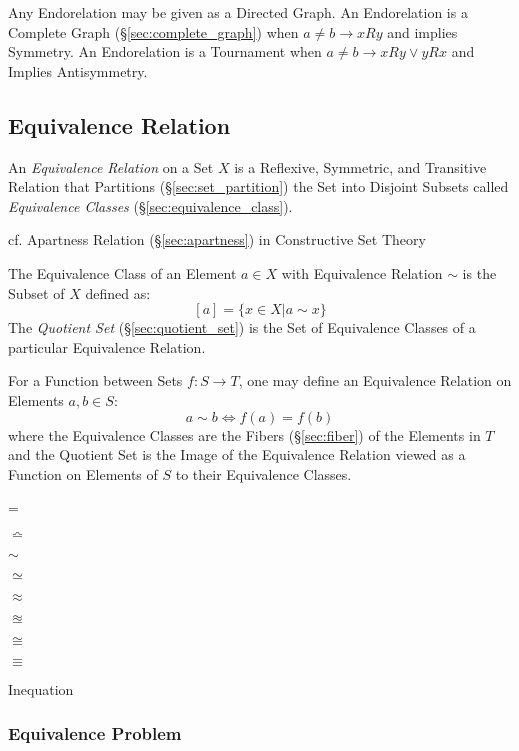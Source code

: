 Any Endorelation may be given as a Directed Graph. An Endorelation is
a Complete Graph (\S\ref{sec:complete_graph}) when $a \neq b
\to xRy$ and implies Symmetry. An Endorelation is a Tournament
when $a \neq b \to xRy \vee yRx$ and Implies Antisymmetry.



\subsection{Equivalence Relation}\label{sec:equivalence_relation}

An \emph{Equivalence Relation} on a Set $X$ is a Reflexive, Symmetric,
and Transitive Relation that Partitions (\S\ref{sec:set_partition})
the Set into Disjoint Subsets called \emph{Equivalence Classes}
(\S\ref{sec:equivalence_class}).

cf. Apartness Relation (\S\ref{sec:apartness}) in Constructive Set Theory

The Equivalence Class of an Element $a \in X$ with Equivalence
Relation $\sim$ is the Subset of $X$ defined as:
\[
    [a] = \{x \in X | a \sim x\}
\]
The \emph{Quotient Set} (\S\ref{sec:quotient_set}) is the Set of
Equivalence Classes of a particular Equivalence Relation.

For a Function between Sets $f : S \to T$, one may define an
Equivalence Relation on Elements $a,b \in S$:
\[
    a \sim b \Leftrightarrow f(a) = f(b)
\]
where the Equivalence Classes are the Fibers (\S\ref{sec:fiber}) of
the Elements in $T$ and the Quotient Set is the Image of the
Equivalence Relation viewed as a Function on Elements of $S$ to their
Equivalence Classes.

=

$\bumpeq$

$\sim$

$\simeq$

$\approx$

$\approxeq$

$\cong$

$\equiv$

Inequation



\subsubsection{Equivalence Problem}\label{sec:equivalence_problem}

